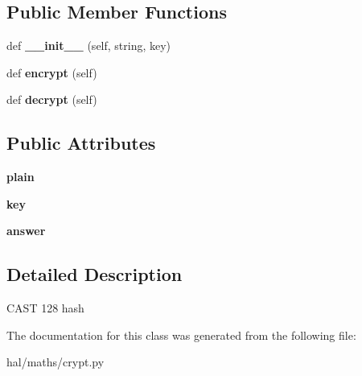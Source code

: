 \subsection*{Public Member Functions}
\begin{DoxyCompactItemize}
\item 
def {\bfseries \+\_\+\+\_\+init\+\_\+\+\_\+} (self, string, key)\hypertarget{classhal_1_1maths_1_1crypt_1_1_c_a_s_t128_a285a3b0d8e5ab5a6aa1bfe2ed07cf275}{}\label{classhal_1_1maths_1_1crypt_1_1_c_a_s_t128_a285a3b0d8e5ab5a6aa1bfe2ed07cf275}

\item 
def {\bfseries encrypt} (self)\hypertarget{classhal_1_1maths_1_1crypt_1_1_c_a_s_t128_a955fa0eab07e305ba028b007c2851abf}{}\label{classhal_1_1maths_1_1crypt_1_1_c_a_s_t128_a955fa0eab07e305ba028b007c2851abf}

\item 
def {\bfseries decrypt} (self)\hypertarget{classhal_1_1maths_1_1crypt_1_1_c_a_s_t128_a70b29321e653c2daaeb2c9e144d2c1c0}{}\label{classhal_1_1maths_1_1crypt_1_1_c_a_s_t128_a70b29321e653c2daaeb2c9e144d2c1c0}

\end{DoxyCompactItemize}
\subsection*{Public Attributes}
\begin{DoxyCompactItemize}
\item 
{\bfseries plain}\hypertarget{classhal_1_1maths_1_1crypt_1_1_c_a_s_t128_af91078dab517ef6705a17f5c41821d27}{}\label{classhal_1_1maths_1_1crypt_1_1_c_a_s_t128_af91078dab517ef6705a17f5c41821d27}

\item 
{\bfseries key}\hypertarget{classhal_1_1maths_1_1crypt_1_1_c_a_s_t128_af89de906c01f3aa02c872831548307a6}{}\label{classhal_1_1maths_1_1crypt_1_1_c_a_s_t128_af89de906c01f3aa02c872831548307a6}

\item 
{\bfseries answer}\hypertarget{classhal_1_1maths_1_1crypt_1_1_c_a_s_t128_a452da0fec6f88f16ec468ceaa55b3d18}{}\label{classhal_1_1maths_1_1crypt_1_1_c_a_s_t128_a452da0fec6f88f16ec468ceaa55b3d18}

\end{DoxyCompactItemize}


\subsection{Detailed Description}
\begin{DoxyVerb}CAST 128 hash \end{DoxyVerb}
 

The documentation for this class was generated from the following file\+:\begin{DoxyCompactItemize}
\item 
hal/maths/crypt.\+py\end{DoxyCompactItemize}
